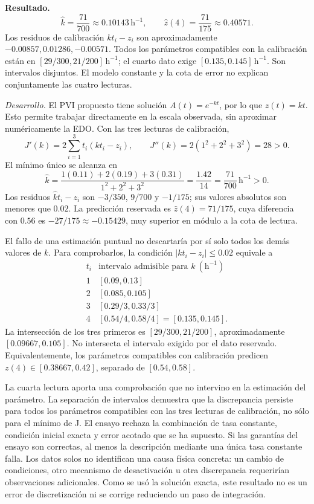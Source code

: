 \noindent\textbf{Resultado.} \[
\widehat k=\frac{71}{700}\approx0.10143\,\mathrm h^{-1},\qquad
\widehat z(4)=\frac{71}{175}\approx0.40571.
\]
Los residuos de calibración \(kt_i-z_i\) son aproximadamente \(-0.00857,0.01286,-0.00571\). Todos los parámetros compatibles con la calibración están en \([29/300,21/200]\,\mathrm h^{-1}\); el cuarto dato exige \([0.135,0.145]\,\mathrm h^{-1}\). Son intervalos disjuntos. El modelo constante y la cota de error no explican conjuntamente las cuatro lecturas.

\noindent\textit{Desarrollo.} El PVI propuesto tiene solución \(A(t)=e^{-kt}\), por lo que \(z(t)=kt\). Esto permite trabajar directamente en la escala observada, sin aproximar numéricamente la EDO. Con las tres lecturas de calibración,
\[
J'(k)=2\sum_{i=1}^3t_i(kt_i-z_i),\qquad J''(k)=2(1^2+2^2+3^2)=28>0.
\]
El mínimo único se alcanza en
\[
\widehat k=\frac{1(0.11)+2(0.19)+3(0.31)}{1^2+2^2+3^2}
=\frac{1.42}{14}=\frac{71}{700}\,\mathrm h^{-1}>0.
\]
Los residuos \(\widehat kt_i-z_i\) son \(-3/350\), \(9/700\) y \(-1/175\); sus valores absolutos son menores que \(0.02\). La predicción reservada es \(\widehat z(4)=71/175\), cuya diferencia con \(0.56\) es \(-27/175\approx-0.15429\), muy superior en módulo a la cota de lectura.

El fallo de una estimación puntual no descartaría por sí solo todos los demás valores de \(k\). Para comprobarlos, la condición \(|kt_i-z_i|\le0.02\) equivale a
\[
\begin{array}{c|c}
t_i&\text{intervalo admisible para }k\ (\mathrm h^{-1})\\\hline
1&[0.09,0.13]\\
2&[0.085,0.105]\\
3&[0.29/3,0.33/3]\\
4&[0.54/4,0.58/4]=[0.135,0.145].
\end{array}
\]
La intersección de los tres primeros es \([29/300,21/200]\), aproximadamente \([0.09667,0.105]\). No intersecta el intervalo exigido por el dato reservado. Equivalentemente, los parámetros compatibles con calibración predicen \(z(4)\in[0.38667,0.42]\), separado de \([0.54,0.58]\).

La cuarta lectura aporta una comprobación que no intervino en la estimación del parámetro. La separación de intervalos demuestra que la discrepancia persiste para todos los parámetros compatibles con las tres lecturas de calibración, no sólo para el mínimo de J. El ensayo rechaza la combinación de tasa constante, condición inicial exacta y error acotado que se ha supuesto. Si las garantías del ensayo son correctas, al menos la descripción mediante una única tasa constante falla. Los datos solos no identifican una causa física concreta: un cambio de condiciones, otro mecanismo de desactivación u otra discrepancia requerirían observaciones adicionales. Como se usó la solución exacta, este resultado no es un error de discretización ni se corrige reduciendo un paso de integración.
